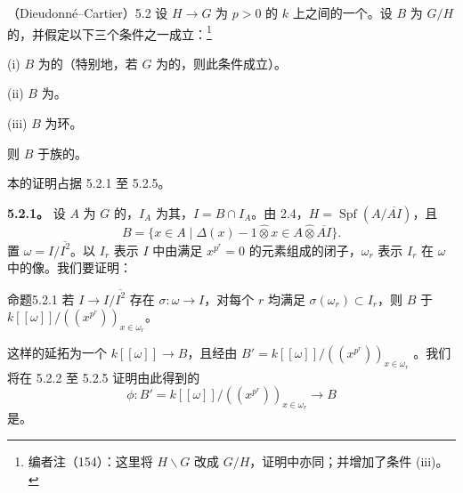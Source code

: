 \begin{SGAresult}{（Dieudonn\'e--Cartier）}{5.2}
设 $H\to G$ 为 $p>0$ 的 $k$ 上之间的一个。设 $B$ 为 $G/H$ 的，并假定以下三个条件之一成立：\footnote{编者注（154）：这里将 $H\backslash G$ 改成 $G/H$，证明中亦同；并增加了条件 (iii)。}

(i) $B$ 为的（特别地，若 $G$ 为的，则此条件成立）。

(ii) $B$ 为。

(iii) $B$ 为环。

则 $B$ 于族的。
\end{SGAresult}
本的证明占据 5.2.1 至 5.2.5。

\textbf{5.2.1。} 设 $A$ 为 $G$ 的，$I_A$ 为其，$I=B\cap I_A$。由 2.4，$H=\operatorname{Spf}(A/\overline{AI})$，且
\[B=\{x\in A\mid\Delta(x)-1\widehat\otimes x\in A\widehat\otimes\overline{AI}\}.\]
置 $\omega=I/\overline{I^2}$。以 $I_r$ 表示 $I$ 中由满足 $x^{p^r}=0$ 的元素组成的闭子，$\omega_r$ 表示 $I_r$ 在 $\omega$ 中的像。我们要证明：
\begin{SGAresult}{命题}{5.2.1}
若 $I\to I/\overline{I^2}$ 存在 $\sigma:\omega\to I$，对每个 $r$ 均满足 $\sigma(\omega_r)\subset I_r$，则 $B$ 于 $k[[\omega]]/((x^{p^r}))_{x\in\omega_r}$。
\end{SGAresult}
这样的延拓为一个 $k[[\omega]]\to B$，且经由 $B'=k[[\omega]]/((x^{p^r}))_{x\in\omega_r}$ 。我们将在 5.2.2 至 5.2.5 证明由此得到的
\[\phi:B'=k[[\omega]]/((x^{p^r}))_{x\in\omega_r}\longrightarrow B\]
是。

